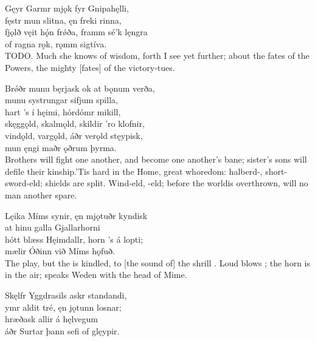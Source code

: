 \bva Gęyr Garmr mjǫk \hld fyr Gnipahęlli, \\%
fęstr mun slitna, \hld ęn freki rinna, \\%
fjǫlð vęit hǫ́n frǿða, \hld framm sé'k lęngra \\%
of ragna rǫk, \hld rǫmm sigtíva.\\%

\bvb TODO. Much she knows of wisdom, forth I see yet further; about the fates of the Powers, the mighty [fates] of the victory-tues.

\bva Brǿðr munu bęrjask \hld ok at bǫnum verða, \\%
munu systrungar \hld sifjum spilla, \\%
hart ’s í hęimi, \hld hórdómr mikill, \\%
skęggǫld, skalmǫld, \hld skildir 'ro klofnir, \\%
vindǫld, vargǫld, \hld áðr verǫld stęypisk, \\%
mun ęngi maðr \hld ǫðrum þyrma.\\%

\bvb Brothers will fight one another, and become one another’s bane; sister's sons will defile their kinship.\footnotemark[1] ’Tis hard in the Home, great whoredom: halberd-, short-sword-eld; shields are split. Wind-eld, -eld; before the world\footnotemark[2] is overthrown, will no man another spare.

\bva Lęika Míms synir, \hld ęn mjǫtuðr kyndisk \\%
at hinu galla \hld Gjallarhorni \\%
hótt blæss Hęimdallr, \hld horn ’s á lopti; \\%
mælir Óðinn \hld við Míms hǫfuð.\\%

\bvb The  play, but the  is kindled, to [the sound of] the shrill . Loud blows ; the horn is in the air; speaks Weden with the head of Mime.

\bva Skęlfr Yggdrasils \hld askr standandi, \\%
ymr aldit tré, \hld ęn jǫtunn losnar; \\%
hræðask allir \hld á hęlvegum \\%
áðr Surtar þann \hld sefi of glęypir.\\%

